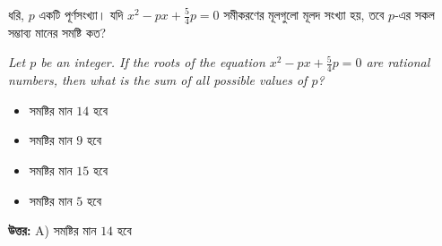 \documentclass[12pt, a4paper]{article}
\begin{document}
\vspace{1.5em}

\begin{tcolorbox}[questionbox={প্রশ্ন (Question) 36}]
    \noindent
    ধরি, $p$ একটি পূর্ণসংখ্যা। যদি $x^2 - px + \frac{5}{4}p = 0$ সমীকরণের মূলগুলো মূলদ সংখ্যা হয়, তবে $p$-এর সকল সম্ভাব্য মানের সমষ্টি কত?
    
    \vspace{0.8em}
    \begin{english}
    \noindent\textit{\color{darkgray}
    Let $p$ be an integer. If the roots of the equation $x^2 - px + \frac{5}{4}p = 0$ are rational numbers, then what is the sum of all possible values of $p$?
    }
    \end{english}
\end{tcolorbox}

\begin{itemize}[label={}, leftmargin=1cm, itemsep=0.5em]
    \item[\textbf{A)}] সমষ্টির মান $14$ হবে
    \item[\textbf{B)}] সমষ্টির মান $9$ হবে
    \item[\textbf{C)}] সমষ্টির মান $15$ হবে
    \item[\textbf{D)}] সমষ্টির মান $5$ হবে
\end{itemize}

\vspace{0.5em}
\begin{tcolorbox}[answerbox]
    \textbf{\color{success} উত্তর:} A) সমষ্টির মান $14$ হবে
\end{tcolorbox}
\vspace{1em}
\end{document}
